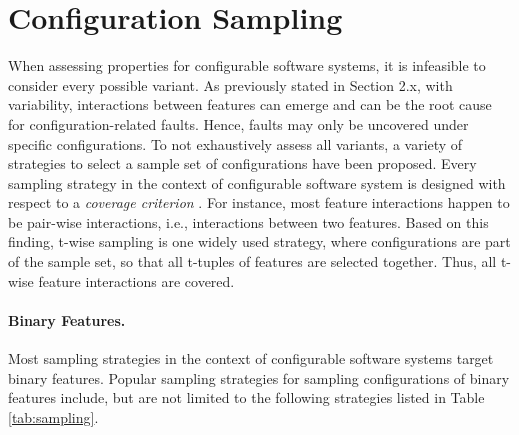 
\section{Configuration Sampling}\label{sec:configuration_sam}
When assessing properties for configurable software systems, it is infeasible
to consider every possible variant. As previously stated in Section 2.x, with
variability, interactions between features can emerge and can be the root cause
for configuration-related faults. Hence, faults may only be uncovered under
specific configurations. To not exhaustively assess all variants, a variety of
strategies to select a sample set of configurations have been proposed.
Every sampling strategy in the context of configurable software system is
designed with respect to a \emph{coverage criterion} 
\citep{apel_feature-oriented_2013}. For instance, most feature interactions
happen to be pair-wise interactions, i.e., interactions between two features.
Based on this finding, t-wise sampling is one widely used
strategy, where configurations are part of the sample set, so that all t-tuples
of features are selected together. Thus, all t-wise feature interactions are
covered. 

\paragraph{Binary Features.}
Most sampling strategies in the context of configurable software systems
target binary features. Popular sampling strategies for sampling configurations
of binary features include, but are not limited to the following
\citep{apel_feature-oriented_2013,medeiros_comparison_2016} strategies listed in
Table \ref{tab:sampling}.

